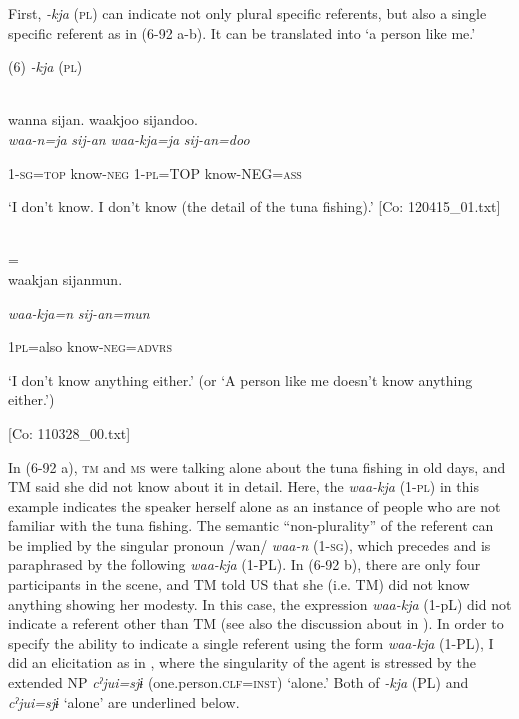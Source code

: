 First, \textit{{}-kja} (\textsc{pl}) can indicate not only plural specific referents, but also a single specific referent as in (6-92 a-b). It can be translated into ‘a person like me.’

(6)  \textit{{}-kja} (\textsc{pl})

 \ea{}\\
\gll  {\TM}  wanna  sijan.  waakjoo  sijandoo.\\

      \textit{waa-n=ja}  \textit{sij-an}  \textit{waa-kja=ja}  \textit{sij-an=doo}

      1-\textsc{sg}=\textsc{top}  know-\textsc{neg}  1-\textsc{pl}=TOP  know-NEG=\textsc{ass}

\glt ‘I don’t know. I don’t know (the detail of the tuna fishing).’ [Co: 120415\_01.txt]
\z

 \ex{}\\
\gll = \\

{\TM}
\gll waakjan  sijanmun.

      \textit{waa-kja=n}  \textit{sij-an=mun}

      1\textsc{pl}=also  know-\textsc{neg}=\textsc{advrs}

\glt ‘I don’t know anything either.’ (or ‘A person like me doesn’t know anything either.’)

      [Co: 110328\_00.txt]
\z

In (6-92 a), \textsc{tm} and \textsc{ms} were talking alone about the tuna fishing in old days, and TM said she did not know about it in detail. Here, the \textit{waa-kja} (1-\textsc{pl}) in this example indicates the speaker herself alone as an instance of people who are not familiar with the tuna fishing. The semantic “non-plurality” of the referent can be implied by the singular pronoun /wan/ \textit{waa-n} (1-\textsc{sg}), which precedes and is paraphrased by the following \textit{waa-kja} (1-PL). In (6-92 b), there are only four participants in the scene, and TM told US that she (i.e. TM) did not know anything showing her modesty. In this case, the expression \textit{waa-kja} (1-pL) did not indicate a referent other than TM (see also the discussion about  in ). In order to specify the ability to indicate a single referent using the form \textit{waa-kja} (1-PL), I did an elicitation as in , where the singularity of the agent is stressed by the extended NP \textit{cˀjui=sjɨ} (one.person.\textsc{clf}=\textsc{inst}) ‘alone.’ Both of \textit{{}-kja} (PL) and \textit{cˀjui=sjɨ} ‘alone’ are underlined below.

